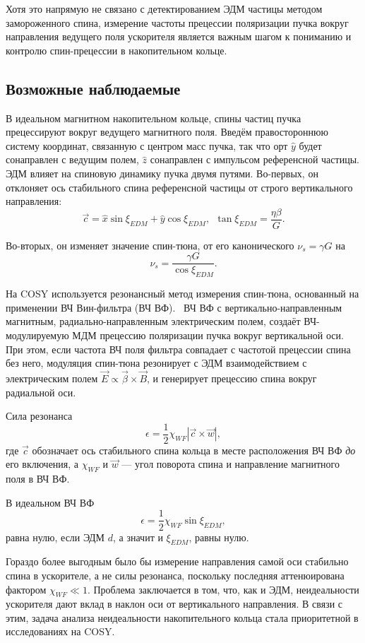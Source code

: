 \newcommand{\cbar}{\vec c}
\newcommand{\wbar}{\vec w}

Хотя это напрямую не связано с детектированием ЭДМ частицы методом замороженного спина,
измерение частоты прецессии поляризации пучка вокруг направления ведущего поля ускорителя
является важным шагом к пониманию и контролю спин-прецессии в накопительном кольце.

\subsection{Возможные наблюдаемые}
В идеальном магнитном накопительном кольце, спины частиц пучка прецессируют вокруг ведущего магнитного
поля. Введём правостороннюю систему координат, связанную с центром масс пучка, так что орт $\hat y$ будет
сонаправлен с ведущим полем, $\hat z$ сонаправлен с импульсом референсной частицы. ЭДМ влияет
на спиновую динамику пучка двумя путями. Во-первых, он отклоняет ось стабильного спина референсной частицы
от строго вертикального направления:~\cite{COSY:SpinTuneMapping}
\[
\cbar = \hat x\sin\xi_{EDM} + \hat y\cos\xi_{EDM}, ~~ \tan\xi_{EDM} = \frac{\eta\beta}{G}.
\]
%

Во-вторых, он изменяет значение спин-тюна, от его канонического $\nu_s = \gamma G$ на
\[
\nu_s = \frac{\gamma G}{\cos\xi_{EDM}}.
\]

На COSY используется резонансный метод измерения спин-тюна, основанный на применении
ВЧ Вин-фильтра (ВЧ ВФ).~\cite{COSY:Partially-Frozen-Spin} ВЧ ВФ с вертикально-направленным магнитным,
радиально-направленным электрическим полем, создаёт ВЧ-модулируемую МДМ прецессию поляризации пучка
вокруг вертикальной оси. При этом, если частота ВЧ поля
фильтра совпадает с частотой прецессии спина без него, модуляция спин-тюна резонирует с ЭДМ взаимодействием
с электрическим полем $\vec E \propto \vec\beta\times\vec B$, и генерирует прецессию спина вокруг радиальной оси.

Сила резонанса
\[
\epsilon = \frac12 \chi_{WF}|\cbar\times\wbar|,
\]
где $\cbar$ обозначает ось стабильного спина кольца в месте расположения ВЧ ВФ \emph{до} его включения,
а $\chi_{WF}$ и $\wbar$ --- угол поворота спина и направление магнитного поля в ВЧ ВФ.

В идеальном ВЧ ВФ
\[
\epsilon = \frac12 \chi_{WF}\sin\xi_{EDM},
\]
равна нулю, если ЭДМ $d$, а значит и $\xi_{EDM}$, равны нулю.~\cite[стр.~5]{COSY:SpinTuneMapping}

Гораздо более выгодным было бы измерение направления самой оси стабильно спина в ускорителе, а не силы резонанса,
поскольку последняя аттенюирована фактором $\chi_{WF}\ll 1$. Проблема заключается в том, что, как и ЭДМ,
неидеальности ускорителя дают вклад в наклон оси от вертикального направления. В связи с этим, задача анализа
неидеальности накопительного кольца стала приоритетной в исследованиях на COSY.


